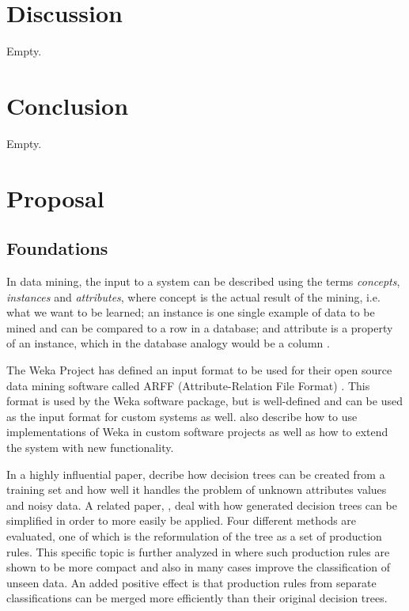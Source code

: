 \documentclass[a4paper]{article}
\begin{document}
\section{Discussion}
Empty.
\section{Conclusion}
Empty.
\section{Proposal}

\subsection{Foundations}
In data mining, the input to a system can be described using the terms \emph{concepts}, \emph{instances} and \emph{attributes}, where concept is the actual result of the mining, i.e. what we want to be learned; an instance is one single example of data to be mined and can be compared to a row in a database; and attribute is a property of an instance, which in the database analogy would be a column \citep{Witten2011}.

The Weka Project has defined an input format to be used for their open source data mining software called ARFF (Attribute-Relation File Format) \citep{Garner1995, Witten2011}. This format is used by the Weka software package, but is well-defined and can be used as the input format for custom systems as well. \citet{Witten2011} also describe how to use implementations of Weka in custom software projects as well as how to extend the system with new functionality.

In a highly influential paper, \citet{Quinlan1986} decribe how decision trees can be created from a training set and how well it handles the problem of unknown attributes values and noisy data. A related paper, \citet{Quinlan1987}, deal with how generated decision trees can be simplified in order to more easily be applied. Four different methods are evaluated, one of which is the reformulation of the tree as a set of production rules. This specific topic is further analyzed in \citet{Quinlan1987b} where such production rules are shown to be more compact and also in many cases improve the classification of unseen data. An added positive effect is that production rules from separate classifications can be merged more efficiently than their original decision trees.
\end{document}
